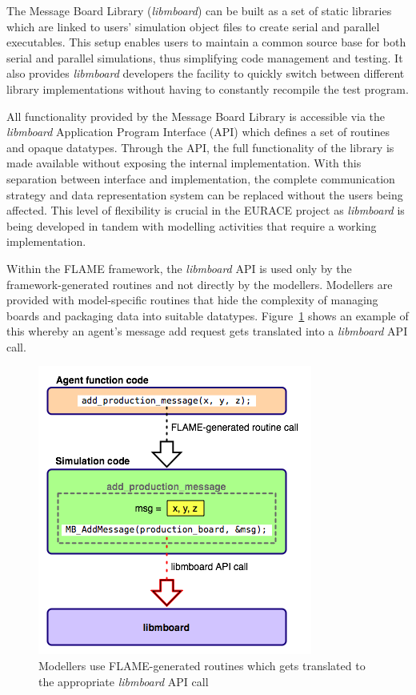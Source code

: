 The Message Board Library (\textit{libmboard}) can be built as a set of static libraries which are linked to users' simulation object files to create serial and parallel executables. This setup enables users to maintain a common source base for both serial and parallel simulations, thus simplifying code management and testing. It also provides \textit{libmboard} developers the facility to quickly switch between different library implementations without having to constantly recompile the test program.

All functionality provided by the Message Board Library is accessible via the \textit{libmboard} Application Program Interface (API) which defines a set of routines and opaque datatypes. Through the API, the full functionality of the library is made available without exposing the internal implementation. With this separation between interface and implementation, the complete communication strategy and data representation system can be replaced without the users being affected. This level of flexibility is crucial in the EURACE project as \textit{libmboard} is being developed in tandem with modelling activities that require a working implementation.

Within the FLAME framework, the \textit{libmboard} API is used only by the framework-generated routines and not directly by the modellers. Modellers are provided with model-specific routines that hide the complexity of managing boards and packaging data into suitable datatypes. Figure~\ref{fig:mb_api_flame} shows an example of this whereby an agent's message add request gets translated into a \textit{libmboard} API call.

\begin{figure}[ht]
 \centering
  \includegraphics[scale=0.60]{mboard_codetranslate.png}
 \caption{Modellers use FLAME-generated routines which gets translated to the appropriate \textit{libmboard} API call}
 \label{fig:mb_api_flame}
\end{figure}


